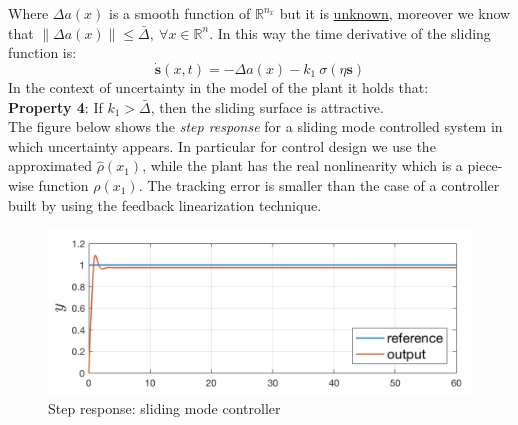 Where $\Delta a(x)$ is a smooth function of $\mathbb{R}^{n_x}$ but it is \underline{unknown}, moreover we know that ${\lVert \Delta a(x) \rVert \le \bar{\Delta}, \ \forall x \in \mathbb{R}^n}$. In this way the time derivative of the sliding function is: 
$$ \dot{\textbf{s}}(x, t)=-\Delta a(x)-k_1 \ \sigma(\eta\textbf{s})$$
In the context of uncertainty in the model of the plant it holds that:\\

\noindent
{\color{red}\textbf{Property 4}}: If $k_1>\bar{\Delta}$, then the sliding surface is attractive. \\

The figure below shows the \textit{step response} for a sliding mode controlled system in which uncertainty appears. In particular for control design we use the approximated $\hat{\rho}(x_1)$, while the plant has the real nonlinearity which is a piece-wise function $\rho(x_1)$. The tracking error is smaller than the case of a controller built by using the feedback linearization technique.

\begin{figure}[h]
    \centering
    \includegraphics[scale=0.7]{NonLinearControl/images/SMC_Tracking.png}
    \caption{Step response: sliding mode controller}
    \label{fig:enter-label}
\end{figure}


